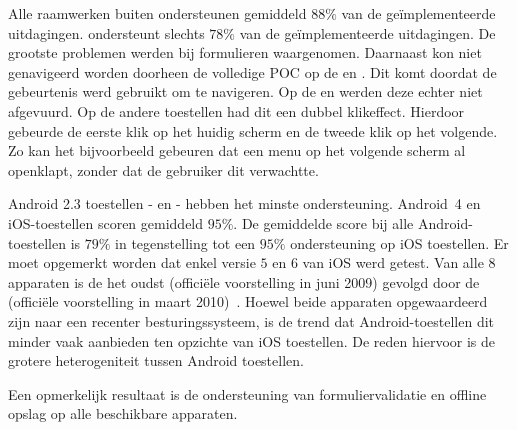 Alle raamwerken buiten \lungo{} ondersteunen gemiddeld $88\%$ van de geïmplementeerde uitdagingen.
\lungo{} ondersteunt slechts $78\%$ van de geïmplementeerde uitdagingen.
De grootste problemen werden bij formulieren waargenomen.
Daarnaast kon niet genavigeerd worden doorheen de volledige POC op de \htc{} en \gtab{}. 
Dit komt doordat de  gebeurtenis werd gebruikt om te navigeren.
Op de \htc{} en \gtab{} werden deze echter niet afgevuurd.
Op de andere toestellen had dit een dubbel klikeffect.
Hierdoor gebeurde de eerste klik op het huidig scherm en de tweede klik op het volgende.
Zo kan het bijvoorbeeld gebeuren dat een menu op het volgende scherm al openklapt, zonder dat de gebruiker dit verwachtte.

Android 2.3 toestellen - \htc{} en \gtab{} - hebben het minste ondersteuning.
Android~4 en iOS-toestellen scoren gemiddeld $95\%$.
De gemiddelde score bij alle Android-toestellen is $79\%$ in tegenstelling tot een $95\%$ ondersteuning op iOS toestellen.
Er moet opgemerkt worden dat enkel versie $5$ en $6$ van iOS werd getest.
Van alle $8$ apparaten is de \iphoneiii{} het oudst (officiële voorstelling in juni 2009) gevolgd door de \gs{} (officiële voorstelling in maart 2010)~\cite{Staff2009,Gideon2010}.
Hoewel beide apparaten opgewaardeerd zijn naar een recenter besturingssysteem, is de trend dat Android-toestellen dit minder vaak aanbieden ten opzichte van iOS toestellen. %
De reden hiervoor is de grotere heterogeniteit tussen Android toestellen.


Een opmerkelijk resultaat is de ondersteuning van formuliervalidatie en offline opslag op alle beschikbare apparaten.


